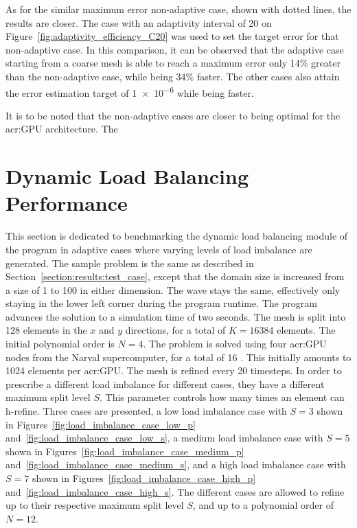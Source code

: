 As for the similar maximum error non-adaptive case, shown with dotted lines, the results are closer.
The case with an adaptivity interval of 20 on Figure~\ref{fig:adaptivity_efficiency_C20} was used to
set the target error for that non-adaptive case. In this comparison, it can be observed that the
adaptive case starting from a coarse mesh is able to reach a maximum error only 14\% greater than
the non-adaptive case, while being 34\% faster. The other cases also attain the error estimation
target of \num{1e-6} while being faster.

It is to be noted that the non-adaptive cases are closer to being optimal for the \acrshort{acr:GPU}
architecture. The


\section{Dynamic Load Balancing Performance}\label{section:results:load_balancing_performance}

This section is dedicated to benchmarking the dynamic load balancing module of the program in
adaptive cases where varying levels of load imbalance are generated. The sample problem is the same
as described in Section~\ref{section:results:test_case}, except that the domain size is increased
from a size of 1 to 100 in either dimension. The wave stays the same, effectively only staying in
the lower left corner during the program runtime. The program advances the solution to a simulation
time of two seconds. The mesh is split into 128 elements in the \(x\) and \(y\) directions, for a
total of \(K = 16384\) elements. The initial polynomial order is \(N = 4\). The problem is solved
using four \acrshort{acr:GPU} nodes from the Narval supercomputer, for a total of 16
. This initially amounts to 1024 elements per \acrshort{acr:GPU}. The mesh is
refined every 20 timesteps. In order to prescribe a different load imbalance for different cases,
they have a different maximum split level \(S\). This parameter controls how many times an element
can h-refine. Three cases are presented, a low load imbalance case with \(S = 3\) shown in
Figures~\ref{fig:load_imbalance_case_low_p} and~\ref{fig:load_imbalance_case_low_s}, a medium load
imbalance case with \(S = 5\) shown in Figures~\ref{fig:load_imbalance_case_medium_p}
and~\ref{fig:load_imbalance_case_medium_s}, and a high load imbalance case with \(S = 7\) shown in
Figures~\ref{fig:load_imbalance_case_high_p} and~\ref{fig:load_imbalance_case_high_s}. The different
cases are allowed to refine up to their respective maximum split level \(S\), and up to a polynomial
order of \(N = 12\). 


